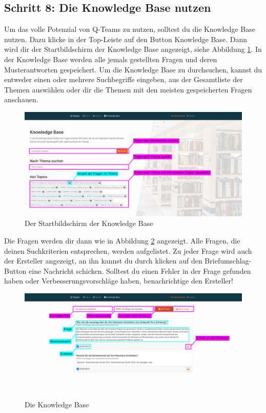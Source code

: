 \documentclass[a4paper,11pt,listof=numbered,glossary=totoc,parskip=half,toc=bib]{scrreprt}
\begin{document}
\begin{appendices}
	\newpage
	\section*{Schritt 8: Die Knowledge Base nutzen}
						
	Um das volle Potenzial von Q-Teams zu nutzen, solltest du die Knowledge Base nutzen. Dazu klicke in der Top-Leiste auf den Button Knowledge Base. Dann wird dir der Startbildschirm der Knowledge Base angezeigt, siehe Abbildung \ref{fig:guide_kb_start}. In der Knowledge Base werden alle jemals gestellten Fragen und deren Musterantworten gespeichert. Um die Knowledge Base zu durchsuchen, kannst du entweder einen oder mehrere Suchbegriffe eingeben, aus der Gesamtliste der Themen auswählen oder dir die Themen mit den meisten gespeicherten Fragen anschauen.				
						
	\begin{figure}[h!]
		\centering
		\includegraphics[width=\textwidth]{UserGuide/Knowledge_Base_start.png}
		\caption{Der Startbildschirm der Knowledge Base}
		\label{fig:guide_kb_start}
	\end{figure}	
	
	Die Fragen werden dir dann wie in Abbildung \ref{fig:guide_kb} angezeigt. Alle Fragen, die deinen Suchkriterien entsprechen, werden aufgelistet. Zu jeder Frage wird auch der Ersteller angezeigt, an ihn kannst du durch klicken auf den Briefumschlag-Button eine Nachricht schicken. Solltest du einen Fehler in der Frage gefunden haben oder Verbesserungsvorschläge haben, benachrichtige den Ersteller!
	
	\begin{figure}[h!]
		\centering
		\includegraphics[width=\textwidth]{UserGuide/Knowledge_Base.png}
		\caption{Die Knowledge Base}
		\label{fig:guide_kb}
	\end{figure}	
	

\end{appendices}
\end{document}
